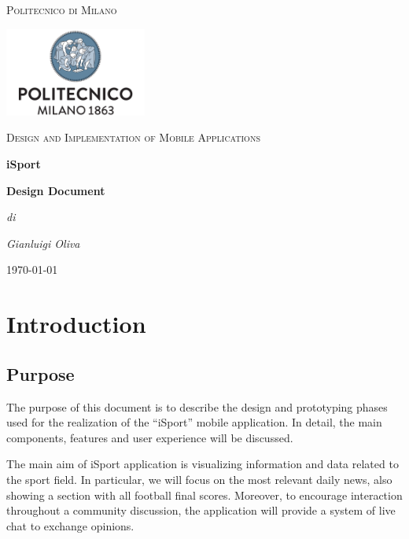 \documentclass[numbers=noenddot, 12pt, a4paper, oneside]{scrbook}
\begin{document}
\begin{titlepage}
	\centering
	{\scshape\LARGE Politecnico di Milano \par}
	\vspace{1cm}
	\includegraphics[width=0.35\textwidth]{polimi-logo}\par
	\vspace{1cm}

	{\scshape\Large Design and Implementation of Mobile Applications\par}
	\vspace{1.5cm}
	{\huge\bfseries iSport \par}
	\vspace{1cm}
	{\Large\bfseries Design Document \par}
	\vspace{3cm}
	{\Large\itshape di\par}
	{\Large\itshape Gianluigi Oliva\par}
	\vspace{1.5cm}
	\vfill
	


	\vfill

	{\large \today\par}
\end{titlepage}

\newpage
\tableofcontents
\newpage


\chapter{Introduction}

\section{Purpose}
The purpose of this document is to describe the design and prototyping phases used for the realization of the “iSport” mobile application. In detail, the main components, features and user experience will be discussed.

The main aim of iSport application is visualizing information and data related to the sport field. In particular, we will focus on the most relevant daily news, also showing a section with all football final scores. Moreover, to encourage interaction throughout a community discussion, the application will provide a system of live chat to exchange opinions.
\end{document}

